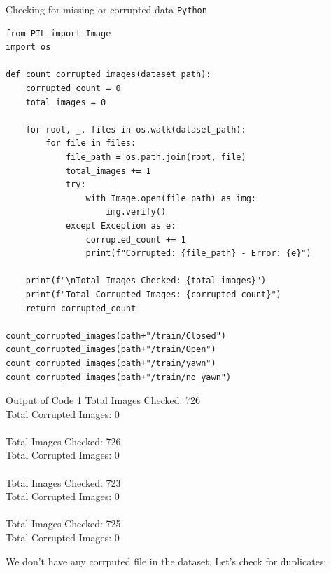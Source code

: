 \documentclass{modeleRapport}
\begin{document}
\begin{codebox}{Checking for missing or corrupted data \texttt{Python}}
\begin{verbatim}
from PIL import Image
import os

def count_corrupted_images(dataset_path):
    corrupted_count = 0
    total_images = 0

    for root, _, files in os.walk(dataset_path):
        for file in files:
            file_path = os.path.join(root, file)
            total_images += 1
            try:
                with Image.open(file_path) as img:
                    img.verify()
            except Exception as e:
                corrupted_count += 1
                print(f"Corrupted: {file_path} - Error: {e}")

    print(f"\nTotal Images Checked: {total_images}")
    print(f"Total Corrupted Images: {corrupted_count}")
    return corrupted_count

count_corrupted_images(path+"/train/Closed")
count_corrupted_images(path+"/train/Open")
count_corrupted_images(path+"/train/yawn")
count_corrupted_images(path+"/train/no_yawn")
\end{verbatim}
\end{codebox}

\begin{codebox}[OutputA]{ Output of Code 1}
Total Images Checked: 726\\
Total Corrupted Images: 0\\
\\
Total Images Checked: 726\\
Total Corrupted Images: 0\\
\\
Total Images Checked: 723\\
Total Corrupted Images: 0\\
\\
Total Images Checked: 725\\
Total Corrupted Images: 0\\
\end{codebox}

We don't have any corrputed file in the dataset. Let's check for duplicates:
\end{document}
